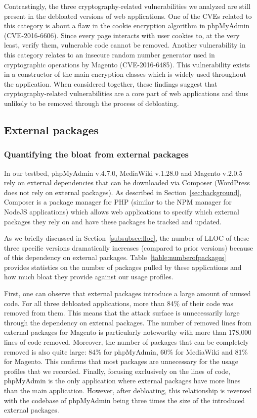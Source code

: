 Contrastingly, the three cryptography-related vulnerabilities we analyzed are
still present in the debloated versions of web applications. One of the CVEs
related to this category is about a flaw in the cookie encryption algorithm in
phpMyAdmin (CVE-2016-6606). Since every page interacts with user
cookies to, at the very least, verify them, vulnerable code cannot be
removed. Another vulnerability in this category relates to an insecure random
number generator used in cryptographic operations by Magento (CVE-2016-6485).
This vulnerability exists in a constructor of the main encryption
classes which is widely used throughout the application. When considered
together, these findings suggest that cryptography-related vulnerabilities
are a core part of web applications and thus unlikely to be removed through
the process of debloating.

\subsection{External packages}
\label{subsec:external}

\subsubsection{Quantifying the bloat from external packages}
In our testbed, phpMyAdmin v.4.7.0, MediaWiki v.1.28.0 and Magento v.2.0.5 rely
on external dependencies that can be downloaded via Composer (WordPress does not rely on external packages). As described in
Section~\ref{sec:background}, Composer is a package manager for PHP (similar
to the NPM manager for NodeJS applications) which allows web applications
to specify which external packages they rely on and have these packages be
tracked and updated.

As we briefly discussed in Section~\ref{subsubsec:lloc}, the number of LLOC of
these three specific versions dramatically
increases (compared to prior versions) because of this dependency on external
packages. Table~\ref{table:numberofpackages} provides statistics on the
number of packages pulled by these applications and how much bloat they
provide against our usage profiles.


First, one can observe that external packages introduce a large amount of
unused code. For all three debloated applications, more than 84\% of their code
was removed from them. This means that the attack surface is unnecessarily
large through the dependency on external packages. The number of removed
lines from external packages for Magento is particularly noteworthy with
more than 178,000 lines of code removed. Moreover, the number of packages
that can be completely removed is also quite large: 84\% for phpMyAdmin,
60\% for MediaWiki and 81\% for Magento. This confirms that most packages
are unnecessary for the usage profiles that we recorded. Finally, focusing
exclusively on the lines of code, phpMyAdmin is the only application where
external packages have more lines than the main application. However, after
debloating, this relationship is reversed with the codebase of phpMyAdmin
being three times the size of the introduced external packages.


